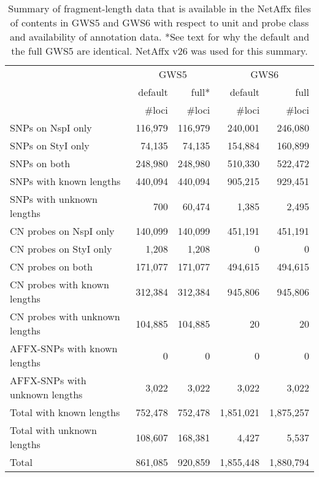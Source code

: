 \documentclass[10pt,a4paper]{article}
\newcommand{\GWSFive}{GWS5\xspace}
\newcommand{\GWSSix}{GWS6\xspace}
\begin{document}
\begin{table}[htp]
\begin{center}
\begin{tabular}{|l||rr||rr|}
\hline
     & \multicolumn{2}{c||}{\GWSFive} & \multicolumn{2}{c|}{\GWSSix} \\
     & default & full* & default & full \\
     & \#loci & \#loci & \#loci & \#loci \\
\hline
\hline
SNPs on NspI only        & 116,979 &  116,979  &   240,001 &   246,080 \\
SNPs on StyI only        &  74,135 &   74,135  &   154,884 &   160,899 \\
SNPs on both             & 248,980 &  248,980  &   510,330 &   522,472 \\
\hline
SNPs with known lengths  & 440,094 &  440,094  &   905,215 &   929,451 \\
SNPs with unknown lengths&     700 &   60,474  &     1,385 &     2,495 \\
\hline
\hline
CN probes on NspI only   & 140,099 &  140,099  &   451,191 &   451,191 \\
CN probes on StyI only   &   1,208 &    1,208  &         0 &         0 \\
CN probes on both        & 171,077 &  171,077  &   494,615 &   494,615 \\
\hline
CN probes with known lengths   & 312,384 &  312,384  &   945,806 &   945,806 \\
CN probes with unknown lengths & 104,885 &  104,885  &        20 &        20 \\
\hline
\hline
AFFX-SNPs with known lengths   &       0 &        0  &         0 &         0 \\
AFFX-SNPs with unknown lengths &   3,022 &    3,022  &     3,022 &     3,022 \\
\hline
\hline
Total with known lengths       & 752,478 &  752,478  & 1,851,021 & 1,875,257 \\
Total with unknown lengths     & 108,607 &  168,381  &     4,427 &     5,537 \\
\hline
Total                          & 861,085 &  920,859  & 1,855,448 & 1,880,794 \\
\hline
\end{tabular}
\end{center}
\caption{Summary of fragment-length data that is available in the NetAffx files of contents in GWS5 and GWS6 with respect to unit and probe class and availability of annotation data.  *See text for why the default and the full GWS5 are identical.  NetAffx v26 was used for this summary.}
\label{tblGenomicLocation}
\end{table}
\end{document}
